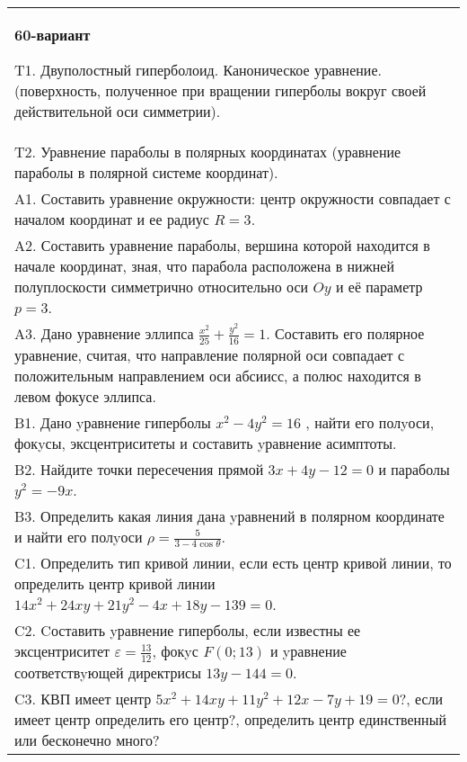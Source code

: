 \documentclass{article}
\begin{document}
\begin{tabular}{m{17cm}}
\textbf{60-вариант}
\newline

T1. Двуполостный гиперболоид. Каноническое уравнение. (поверхность, полученное при вращении гиперболы вокруг своей действительной оси симметрии).\\

T2. Уравнение параболы в полярных координатах (уравнение параболы в полярной системе координат).\\

A1. Составить уравнение окружности: центр окружности совпадает с началом координат и ее радиус $R=3$.\\

A2. Составить уравнение параболы, вершина которой находится в начале координат, зная, что парабола расположена в нижней полуплоскости симметрично относительно оси $Oy$ и её параметр $p=3$.\\

A3. Дано уравнение эллипса $\frac{x^2}{25}+\frac{y^2}{16}=1$. Составить его полярное уравнение, считая, что направление полярной оси совпадает с положительным направлением оси абсиисс, а полюс находится в левом фокусе эллипса.\\

B1. Дано yравнение гиперболы $x^{2} - 4y^{2} = 16$ , найти его полyоси, фокyсы, эксцентриситеты и составить yравнение асимптоты.\\

B2. Найдите точки пересечения прямой $3x + 4y - 12 = 0$ и параболы $y^{2} = - 9x$.  \\

B3. Определить какая линия дана yравнений в полярном координате и найти его полyоси $\rho = \frac{5}{3 - 4\cos\theta}$.  \\

C1. Определить тип кривой линии, если есть центр кривой линии, то определить центр кривой линии $14x^{2}+24xy+21y^{2}-4x+18y-139=0$.  \\

C2. Cоставить yравнение гиперболы, если известны ее эксцентриситет $\varepsilon=\frac{13}{12}$, фокyс $F(0;13)$ и yравнение соответствyющей директрисы $13y-144=0$.  \\

C3. КВП имеет центр $5x^{2}+14xy+11y^{2}+12x-7y+19=0$?, если имеет центр определить его центр?, определить центр единственный или бесконечно много?  \\

\end{tabular}
\vspace{1cm}
\end{document}
